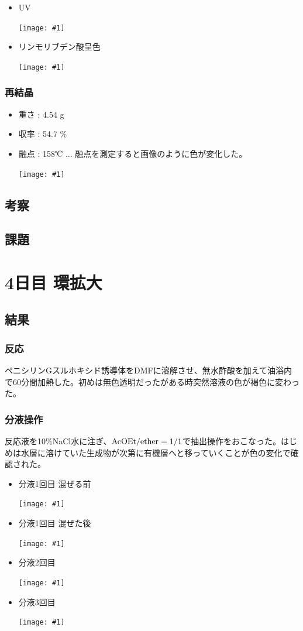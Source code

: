 \documentclass[a4paper,papersize,dvipdfmx]{jsarticle}
\newcommand{\pict}[2]{\begin{center} \texttt{[image: \#1]} \end{center}}   %
\begin{document}
\begin{itemize}
\item UV
\pict{imgs3/tlc1.jpg}{10}

\item リンモリブデン酸呈色
\pict{imgs3/tlc2.jpg}{10}


\end{itemize}
\subsubsection*{再結晶}
\begin{itemize}
\item 重さ : 4.54 g
\item 収率 : 54.7 $\%$
\item 融点 : 158℃  ... 融点を測定すると画像のように色が変化した。

\pict{imgs3/yuten.jpg}{10}

\end{itemize}
\subsection*{考察}
\subsection*{課題}

\section*{4日目 環拡大}
\subsection*{結果}

\subsubsection*{反応}
ペニシリンGスルホキシド誘導体をDMFに溶解させ、無水酢酸を加えて油浴内で60分間加熱した。初めは無色透明だったがある時突然溶液の色が褐色に変わった。

\subsubsection*{分液操作}
反応液を10$\%$NaCl水に注ぎ、$\rm AcOEt / ether = 1/1$で抽出操作をおこなった。はじめは水層に溶けていた生成物が次第に有機層へと移っていくことが色の変化で確認された。

\begin{itemize}
\item 分液1回目 混ぜる前
\pict{imgs4/be1.jpg}{10}
\item 分液1回目 混ぜた後
\pict{imgs4/be2.jpg}{10}
\item 分液2回目
\pict{imgs4/be3.jpg}{10}
\item 分液3回目
\pict{imgs4/be4.jpg}{10}

\end{itemize}
\end{document}
